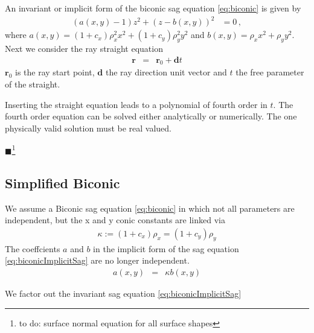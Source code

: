\documentclass[12pt,a4paper,twoside,openright,BCOR10mm,headsepline,titlepage,abstracton,chapterprefix,final]{scrreprt}
\newcommand\Vector[1]{{\mathbf{#1}}}
\newcommand\Location{\Vector{r}}
\newcommand{\remark}[1]{{\color{red}$\blacksquare$}\footnote{{\color{red}#1}}}
\begin{document}
An invariant or implicit form of the biconic sag equation \eqref{eq:biconic} is given by
\begin{align}
 (a(x,y) - 1) z^2 + (z - b(x,y))^2 &= 0\,,\label{eq:biconicImplicitSag}
\end{align}
where $a(x,y) = (1 + c_x) \rho_x^2 x^2 + (1 + c_y) \rho_y^2 y^2$ and $b(x,y) = \rho_x x^2 + \rho_y y^2$. 
Next we consider the ray straight equation
\begin{eqnarray}
 \Location &=& \Location_0 + \Vector{d} t \label{eq:ray}
\end{eqnarray}
$\Location_0$ is the ray start point, $\Vector{d}$ the ray direction unit vector and $t$ the free parameter of the straight.

Inserting the straight equation leads to a polynomial of fourth order in $t$.
The fourth order equation can be solved either analytically or numerically.
The one physically valid solution must be real valued.

\remark{to do: surface normal equation for all surface shapes}

\subsection{Simplified Biconic}
We assume a Biconic sag equation \eqref{eq:biconic} in which not all parameters are independent, but the x and y conic constants are linked via
\begin{eqnarray}
 \kappa := (1 + c_x) \rho_x = (1 + c_y) \rho_y
\end{eqnarray}
The coeffcients $a$ and $b$ in the implicit form of the sag equation \ref{eq:biconicImplicitSag} are no longer independent.
\begin{eqnarray}
 a(x,y) &=& \kappa b(x,y) 
\end{eqnarray}

We factor out the invariant sag equation \ref{eq:biconicImplicitSag}
\end{document}
